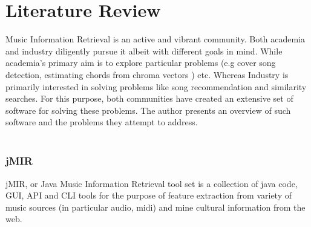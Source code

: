 \chapter{Literature Review}

\noindent Music Information Retrieval is an active and vibrant community. Both academia and industry diligently pursue it albeit with different goals in mind. While academia's primary aim is to explore particular problems (e.g cover song detection, estimating chords from chroma vectors \cite{chord-detection} ) etc. Whereas Industry is primarily interested in solving problems like song recommendation and similarity searches. For this purpose, both communities have created an extensive set of software for solving these problems. The author presents an overview of such software and the problems they attempt to address. \\\\

\subsection{jMIR}

\noindent jMIR, or Java Music Information Retrieval tool set \cite{jMIR} is a collection of java code, GUI, API and CLI tools for the purpose of feature extraction from variety of music sources (in particular audio, midi) and mine cultural information from the web.